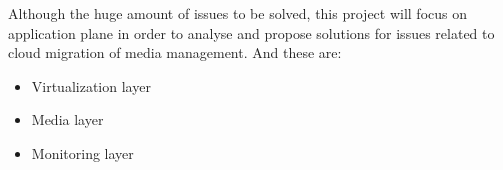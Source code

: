 Although the huge amount of issues to be solved, this project will focus on application plane in order to analyse and propose solutions for issues related to cloud migration of media management. And these are:

 \begin{itemize}
  \item Virtualization layer \hfill \\
  \item Media layer \hfill \\
  \item Monitoring layer \hfill \\
\end{itemize}






